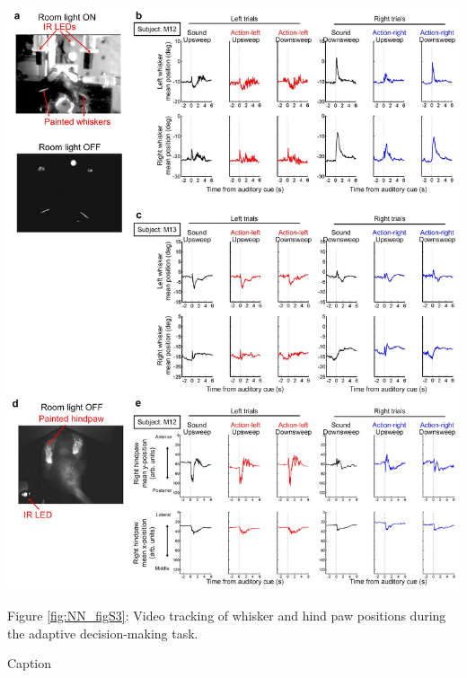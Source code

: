 \begin{FPfigure}[htbp]

\begin{center}
\includegraphics[width=\textwidth]{Figures/NN_figS3.jpg} 
\end{center}
\small{Figure \ref{fig:NN_figS3}: Video tracking of whisker and hind paw positions during the adaptive decision-making task.}

\caption[Video tracking of whisker and hindpaw positions during the adaptive decision-making task.]
{Caption}


\label{fig:NN_figS3}
\end{FPfigure}